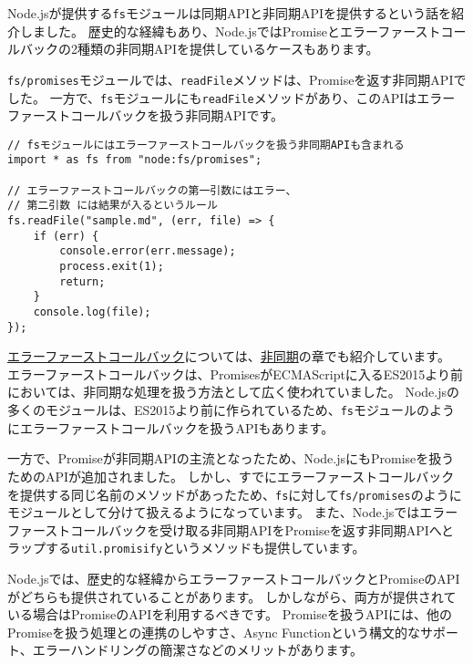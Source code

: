 \begin{tcolorbox}[enhanced jigsaw,breakable,title=Node.jsのエラーファーストコールバック]\label{node-error-first-callbak}

Node.jsが提供する\texttt{fs}モジュールは同期APIと非同期APIを提供するという話を紹介しました。
歴史的な経緯もあり、Node.jsではPromiseとエラーファーストコールバックの2種類の非同期APIを提供しているケースもあります。

\texttt{fs/promises}モジュールでは、\texttt{readFile}メソッドは、Promiseを返す非同期APIでした。
一方で、\texttt{fs}モジュールにも\texttt{readFile}メソッドがあり、このAPIはエラーファーストコールバックを扱う非同期APIです。

\begin{lstlisting}
// fsモジュールにはエラーファーストコールバックを扱う非同期APIも含まれる
import * as fs from "node:fs/promises";

// エラーファーストコールバックの第一引数にはエラー、
// 第二引数 には結果が入るというルール
fs.readFile("sample.md", (err, file) => {
    if (err) {
        console.error(err.message);
        process.exit(1);
        return;
    }
    console.log(file);
});
\end{lstlisting}

\hyperlink{error-first-callback}{エラーファーストコールバック}については、\hyperlink{async-handling}{非同期}の章でも紹介しています。
エラーファーストコールバックは、PromisesがECMAScriptに入るES2015より前においては、非同期な処理を扱う方法として広く使われていました。
Node.jsの多くのモジュールは、ES2015より前に作られているため、\texttt{fs}モジュールのようにエラーファーストコールバックを扱うAPIもあります。

一方で、Promiseが非同期APIの主流となったため、Node.jsにもPromiseを扱うためのAPIが追加されました。
しかし、すでにエラーファーストコールバックを提供する同じ名前のメソッドがあったため、\texttt{fs}に対して\texttt{fs/promises}のようにモジュールとして分けて扱えるようになっています。
また、Node.jsではエラーファーストコールバックを受け取る非同期APIをPromiseを返す非同期APIへとラップする\texttt{util.promisify}というメソッドも提供しています。

Node.jsでは、歴史的な経緯からエラーファーストコールバックとPromiseのAPIがどちらも提供されていることがあります。
しかしながら、両方が提供されている場合はPromiseのAPIを利用するべきです。
Promiseを扱うAPIには、他のPromiseを扱う処理との連携のしやすさ、Async Functionという構文的なサポート、エラーハンドリングの簡潔さなどのメリットがあります。
\end{tcolorbox}

